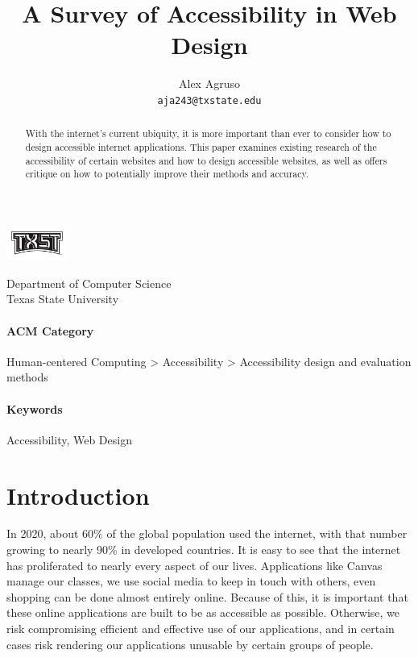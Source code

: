 \documentclass{article}
\title{A Survey of Accessibility in Web Design}
\author{%
  Alex Agruso\\
  \texttt{aja243@txstate.edu} \\
}
\begin{document}
\begin{minipage}{0.15\textwidth}%
	\includegraphics[width=2.0cm]{images/txst-black.jpg}
\end{minipage}%
\hfill%
\begin{minipage}{1\textwidth}\raggedright
	Department of Computer Science\\
	Texas State University\\
\end{minipage}


\maketitle


\begin{abstract}
	With the internet's current ubiquity, it is more important than ever to consider how to design accessible internet applications.
	This paper examines existing research of the accessibility of certain websites and how to design accessible websites, as well as offers critique on how to potentially improve their methods and accuracy.
\end{abstract}


\paragraph{ACM Category} Human-centered Computing > Accessibility > Accessibility design and evaluation methods
\paragraph{Keywords} Accessibility, Web Design


\section{Introduction}
In 2020, about 60\% of the global population used the internet, with that number growing to nearly 90\% in developed countries.
\cite{WorldInternetUsage}
It is easy to see that the internet has proliferated to nearly every aspect of our lives.
Applications like Canvas manage our classes, we use social media to keep in touch with others, even shopping can be done almost entirely online.
Because of this, it is important that these online applications are built to be as accessible as possible.
Otherwise, we risk compromising efficient and effective use of our applications, and in certain cases risk rendering our applications unusable by certain groups of people.
\end{document}
